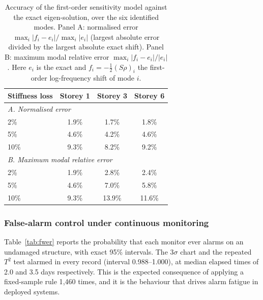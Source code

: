 \documentclass[12pt,a4paper]{article}
\newcommand{\rev}[1]{#1}
\newenvironment{revblock}{}{}
\newcommand{\rev}[1]{{\color{revcol}#1}}
\newenvironment{revblock}{\begingroup\color{revcol}}{\endgroup}
\newcommand{\rtwo}[1]{#1}
\newcommand{\rtwo}[1]{{\color{revcolb}#1}}
\begin{document}
\begin{revblock}
\begin{table}[t]
\centering
\small
\caption{\rtwo{Accuracy of the first-order sensitivity model against the exact eigen-solution, over the six identified modes.} \rtwo{Panel A: normalised error $\max_i|f_i-e_i|/\max_i|e_i|$ (largest absolute error divided by the largest absolute exact shift).} \rtwo{Panel B: maximum modal relative error $\max_i|f_i-e_i|/|e_i|$.} \rtwo{Here $e_i$ is the exact and $f_i=-\tfrac12(S\rho)_i$ the first-order log-frequency shift of mode $i$.}}
\label{tab:validation}
\begin{tabular}{lccc}
\toprule
Stiffness loss & Storey 1 & Storey 3 & Storey 6 \\
\midrule
\multicolumn{4}{l}{\textit{\rtwo{A. Normalised error}}}\\
2\%  & 1.9\% & 1.7\% & 1.8\% \\
5\%  & 4.6\% & 4.2\% & 4.6\% \\
10\% & 9.3\% & 8.2\% & 9.2\% \\
\midrule
\multicolumn{4}{l}{\textit{\rtwo{B. Maximum modal relative error}}}\\
 \rtwo{2\%} & \rtwo{1.9\%} & \rtwo{2.8\%} & \rtwo{2.4\%}  \\
 \rtwo{5\%} & \rtwo{4.6\%} & \rtwo{7.0\%} & \rtwo{5.8\%}  \\
 \rtwo{10\%} & \rtwo{9.3\%} & \rtwo{13.9\%} & \rtwo{11.6\%}  \\
\bottomrule
\end{tabular}
\end{table}
\end{revblock}

\subsubsection{False-alarm control under continuous monitoring}\label{sec:res-fa}

Table~\ref{tab:fwer} reports the probability that each monitor ever alarms on an undamaged structure, \rev{with exact 95\% intervals}. The $3\sigma$ chart and the repeated $T^2$ test alarmed in every record (interval 0.988--1.000), at median elapsed times of 2.0 and 3.5 days respectively. This is the expected consequence of applying a fixed-sample rule 1{,}460 times, and it is the behaviour that drives alarm fatigue in deployed systems.
\end{document}
